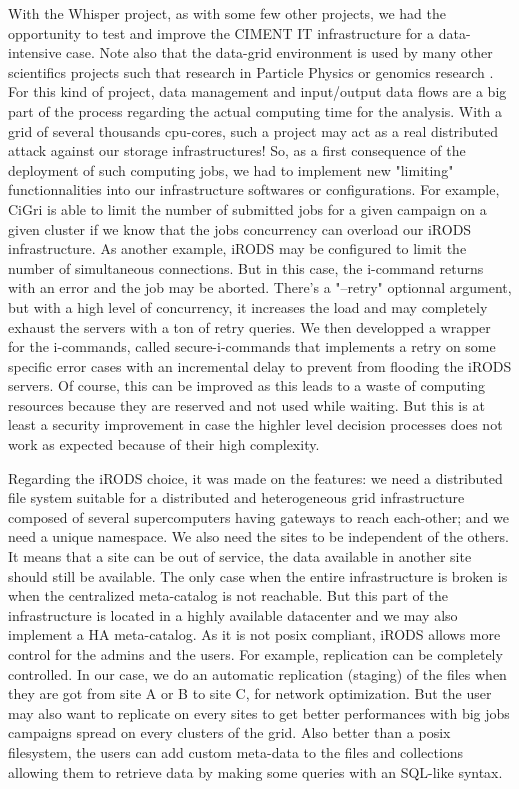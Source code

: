 \documentclass[a4paper, 10pt]{article}
\begin{document}
\begin{multicols}{2}
With the Whisper project, as with some few other projects, we had the opportunity to test and improve the CIMENT IT infrastructure for a data-intensive case. 
Note also that the data-grid environment is used by many other scientifics projects such that research in Particle Physics \cite{key:BB} or genomics research \cite{key:MLBDJ}.
For this kind of project, data management and input/output data flows are a big part of the process regarding the actual computing time for the analysis. With a grid of several thousands cpu-cores, such a project may act as a real distributed attack against our storage infrastructures! So, as a first consequence of the deployment of such computing jobs, we had to implement new "limiting" functionnalities into our infrastructure softwares or configurations. For example, CiGri is able to limit the number of submitted jobs for a given campaign on a given cluster if we know that the jobs concurrency can overload our iRODS infrastructure. As another example, iRODS may be configured to limit the number of simultaneous connections. But in this case, the i-command returns with an error and the job may be aborted. There's a "--retry" optionnal argument, but with a high level of concurrency, it increases the load and may completely exhaust the servers with a ton of retry queries. We then developped a wrapper for the i-commands, called secure-i-commands that implements a retry on some specific error cases  with an incremental delay to prevent from flooding the iRODS servers. Of course, this can be improved as this leads to a waste of computing resources because they are reserved and not used while waiting. But this is at least a security improvement in case the highler level decision processes does not work as expected because of their high complexity.

Regarding the iRODS choice, it was made on the features: we need a distributed file system suitable for a distributed and heterogeneous grid infrastructure composed of several supercomputers having gateways to reach each-other; and we need a unique namespace. We also need the sites to be independent of the others. It means that a site can be out of service, the data available in another site should still be available. The only case when the entire infrastructure is broken is when the centralized meta-catalog is not reachable. But this part of the infrastructure is located in a highly available datacenter and we may also implement a HA meta-catalog. As it is not posix compliant, iRODS allows more control for the admins and the users. For example, replication can be completely controlled. In our case, we do an automatic replication (staging) of the files when they are got from site A or B to site C, for network optimization. But the user may also want to replicate on every sites to get better performances with big jobs campaigns spread on every clusters of the grid. 
Also better than a posix filesystem, the users can add custom meta-data to the files and collections allowing them to retrieve data by making some queries with an SQL-like syntax. 


\end{multicols}
\end{document}
